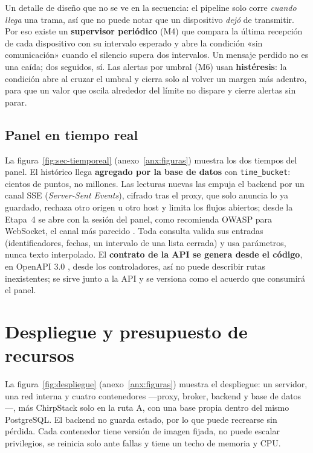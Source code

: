 Un detalle de diseño que no se ve en la secuencia: el pipeline solo corre \emph{cuando llega} una trama,
así que no puede notar que un dispositivo \emph{dejó} de transmitir. Por eso existe un \textbf{supervisor
periódico} (M4) que compara la última recepción de cada dispositivo con su intervalo esperado y abre la
condición «sin comunicación» cuando el silencio supera dos intervalos. Un mensaje perdido no es una
caída; dos seguidos, sí. Las alertas por umbral (M6) usan \textbf{histéresis}: la condición abre al cruzar
el umbral y cierra solo al volver un margen más adentro, para que un valor que oscila alrededor del
límite no dispare y cierre alertas sin parar.

\subsection{Panel en tiempo real}

La figura~\ref{fig:sec-tiemporeal} (anexo~\ref{anx:figuras}) muestra los dos tiempos del panel. El histórico llega
\textbf{agregado por la base de datos} con \texttt{time\_bucket}: cientos de puntos, no millones. Las lecturas
nuevas las empuja el backend por un canal SSE (\emph{Server-Sent Events}), cifrado tras el proxy, que solo anuncia
lo ya guardado, rechaza otro origen u otro host y limita los flujos abiertos; desde la Etapa~4 se abre con la sesión del
panel, como recomienda OWASP para WebSocket, el canal más parecido \parencite{owaspws}. Toda consulta valida sus entradas (identificadores, fechas, un intervalo de una lista
cerrada) y usa parámetros, nunca texto interpolado. El \textbf{contrato de la API se
genera desde el código}, en OpenAPI 3.0 \parencite{openapi303}, desde los controladores, así no puede describir rutas
inexistentes; se sirve junto a la API y se versiona como el acuerdo que consumirá el panel.


\section{Despliegue y presupuesto de recursos}

La figura~\ref{fig:despliegue} (anexo~\ref{anx:figuras}) muestra el despliegue: un servidor, una red interna y
cuatro contenedores —proxy, broker, backend y base de datos—, más ChirpStack solo en la ruta A, con una
base propia dentro del mismo PostgreSQL. El backend no guarda estado, por lo que puede recrearse sin pérdida. Cada contenedor tiene versión de imagen
fijada, no puede escalar privilegios, se reinicia solo ante fallas y tiene un techo de memoria y CPU.


